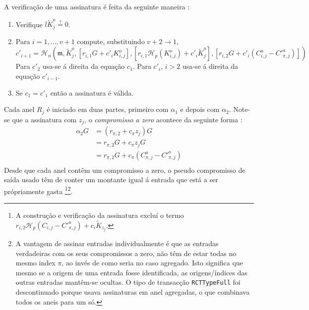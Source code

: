A verificação de uma assinatura é feita da seguinte maneira :

\begin{enumerate}

    \item Verifique \(l \tilde{K}^o_j \stackrel{?}{=} 0\).

	\item Para \(i = 1, ..., v+1\) compute, substituindo \(v+2 \rightarrow 1\),
\[c'_{i+1} = \mathcal{H}_n(\mathfrak{m}, \tilde{K}^o_j, [r_{i, 1} G + c'_i K^o_{i, j}], [r_{i, 1} \mathcal{H}_p(K^o_{i, j}) + c'_i \tilde{K}^o_j], [r_{i, 2}G + c'_i (C^a_{i, j} - C'^a_{\pi, j})])\]
    Para $c'_2$ usa-se á direita da equação $c_1$.\newline
    Para $c'_i$, $i>2$ usa-se á direita da equação $c'_{i-1}$. 
	\item Se \(c_1 = c'_1\) então a assinatura é válida.

\end{enumerate}
\newline
Cada anel $R_j$ é iniciado em duas partes, primeiro com $\alpha_{1}$ e depois com $\alpha_{2}$. Note-se que a assinatura com $z_j$, o {\em compromisso a zero} acontece da seguinte forma :
\begin{align*}
 \alpha_2 G &= (r_{\pi, 2} + c_{\pi} z_j)G\\
            &= r_{\pi, 2}G + c_{\pi} z_j G\\
            &= r_{\pi, 2}G + c_{\pi} (C^a_{\pi, j} - C'^a_{\pi, j})\\
\end{align*}
Desde que cada anel contêm um compromisso a zero, o pseudo compromisso de saída usado têm de conter um montante igual á entrada que está a ser própriamente gasta \footnote{
A construção e verificação da assinatura excluí o termo $r_{i,2} \mathcal{H}_p(C_{i, j} - C'^a_{\pi, j}) + c_i \tilde{K}_{z_j}$.}\footnote{A vantagem de assinar entradas individualmente é que as entradas verdadeiras com os seus compromissos a zero, não têm de estar todas no mesmo index $\pi$, ao invés de como seria no caso agregado. Isto significa que mesmo se a origem de uma entrada fosse identificada, as origens/índices das outras entradas mantêm-se ocultas. O tipo de transacção {\tt RCTTypeFull} foi descontinuado porque usava assinaturas em anel agregadas, o que combinava todos os aneis para um só.}.

